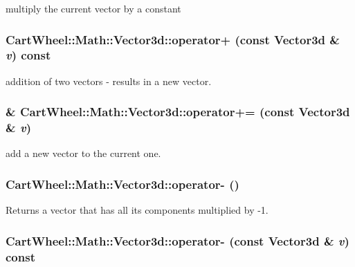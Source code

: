 \label{classCartWheel_1_1Math_1_1Vector3d_a1052925e7cb8182658b5323b26f368ba}
multiply the current vector by a constant \hypertarget{classCartWheel_1_1Math_1_1Vector3d_a4ca951f7fb6910e5c2449b993ef97ca1}{
\subsubsection[{operator+}]{ CartWheel::Math::Vector3d::operator+ (const {\bf Vector3d} \& {\em v}) const}}
\label{classCartWheel_1_1Math_1_1Vector3d_a4ca951f7fb6910e5c2449b993ef97ca1}
addition of two vectors -\/ results in a new vector. \hypertarget{classCartWheel_1_1Math_1_1Vector3d_adcfc67885472fb1b8b88e74539303dfb}{
\subsubsection[{operator+=}]{\& CartWheel::Math::Vector3d::operator+= (const {\bf Vector3d} \& {\em v})}}
\label{classCartWheel_1_1Math_1_1Vector3d_adcfc67885472fb1b8b88e74539303dfb}
add a new vector to the current one. \hypertarget{classCartWheel_1_1Math_1_1Vector3d_a2d6b8355acc0640eeab1d19e9692eee6}{
\subsubsection[{operator-\/}]{ CartWheel::Math::Vector3d::operator-\/ ()}}
\label{classCartWheel_1_1Math_1_1Vector3d_a2d6b8355acc0640eeab1d19e9692eee6}
Returns a vector that has all its components multiplied by -\/1. \hypertarget{classCartWheel_1_1Math_1_1Vector3d_ab93781eb32a9cb2ed4c203b590395937}{
\subsubsection[{operator-\/}]{ CartWheel::Math::Vector3d::operator-\/ (const {\bf Vector3d} \& {\em v}) const}}
